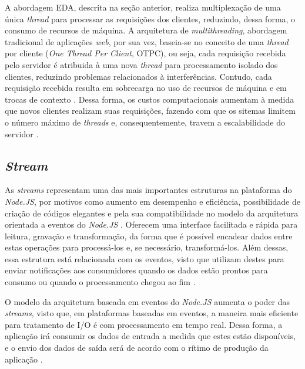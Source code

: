 \documentclass[12pt]{article}
\begin{document}
A abordagem EDA, descrita na seção anterior, realiza multiplexação de uma única \textit{thread} para processar 
as requisições dos clientes, reduzindo, dessa forma, o consumo de recursos de máquina. 
A arquitetura de \textit{multithreading}, abordagem tradicional de aplicações \textit{web}, por sua vez, baseia-se
no conceito de uma \textit{thread} por cliente (\textit{One Thread Per Client}, OTPC), ou seja, cada requisição
recebida pelo servidor é atribuida à uma nova \textit{thread} para processamento isolado dos clientes, reduzindo
problemas relacionados à interferências. Contudo, cada requisição recebida resulta em sobrecarga no uso de
recursos de máquina e em trocas de contexto \cite{JGD}. Dessa forma, os custos computacionais aumentam
à medida que novos clientes realizam suas requisições, fazendo com que os sitemas limitem o número máximo de
\textit{threads} e, consequentemente, travem a escalabilidade do servidor \cite{ZRHR}.


\subsection{\textit{Stream}}

As \textit{streams} representam uma das mais importantes estruturas na plataforma do \textit{Node.JS}, por motivos
como aumento em desempenho e eficiência, possibilidade de criação de códigos elegantes e pela sua compatibilidade
no modelo da arquitetura orientada a eventos do \textit{Node.JS} \cite[p. 119]{MARIO}. Oferecem uma interface facilitada 
e rápida para leitura, gravação e transformação, da forma que é possível encadear dados entre estas operações 
para processá-los e, se necessário, transformá-los. Além dessas, essa estrutura está relacionada com os eventos, visto que
utilizam destes para enviar notificações aos consumidores quando os dados estão prontos para consumo ou quando o
processamento chegou ao fim \cite[p. 28]{DIOGORESENDE}.

O modelo da arquitetura baseada em eventos do \textit{Node.JS} aumenta o poder das \textit{streams}, visto que,
em plataformas baseadas em eventos, a maneira mais eficiente para tratamento de I/O é com processamento em tempo real.
Dessa forma, a aplicação irá consumir os dados de entrada a medida que estes estão disponíveis, e o envio dos dados
de saída será de acordo com o rítimo de produção da aplicação \cite[p. 119]{MARIO}.
\end{document}
